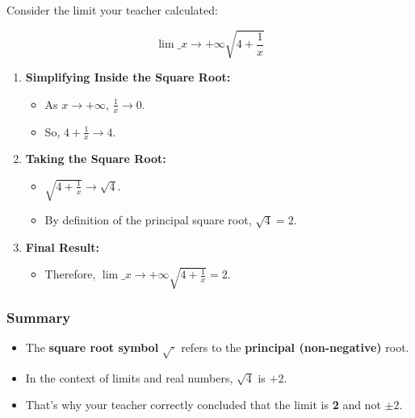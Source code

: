 \documentclass[a4paper,12pt]{book}
\begin{document}
Consider the limit your teacher calculated:

\[
\lim\_{x \to +\infty} \sqrt{4 + \frac{1}{x}}
\]

\begin{enumerate}
\item 
\textbf{Simplifying Inside the Square Root:}
\begin{itemize}
\item 
As \textbf{\( x \to +\infty \)}, \textbf{\( \frac{1}{x} \to 0 \)}.

\item 
So, \textbf{\( 4 + \frac{1}{x} \to 4 \)}.

\end{itemize}

\item 
\textbf{Taking the Square Root:}
\begin{itemize}
\item 
\textbf{\( \sqrt{4 + \frac{1}{x}} \to \sqrt{4} \)}.

\item 
By definition of the principal square root, \textbf{\( \sqrt{4} = 2 \)}.

\end{itemize}

\item 
\textbf{Final Result:}
\begin{itemize}
\item 
Therefore, \textbf{\( \lim\_{x \to +\infty} \sqrt{4 + \frac{1}{x}} = 2 \)}.

\end{itemize}

\end{enumerate}

\subsubsection{Summary}
\begin{itemize}
\item 
The \textbf{square root symbol} \textbf{\( \sqrt{\cdot} \)} refers to the \textbf{principal (non-negative)} root.

\item 
In the context of limits and real numbers, \textbf{\( \sqrt{4} \)} is \textbf{\( +2 \)}.

\item 
That's why your teacher correctly concluded that the limit is \textbf{2} and not \textbf{\( \pm 2 \)}.

\end{itemize}
\end{document}
